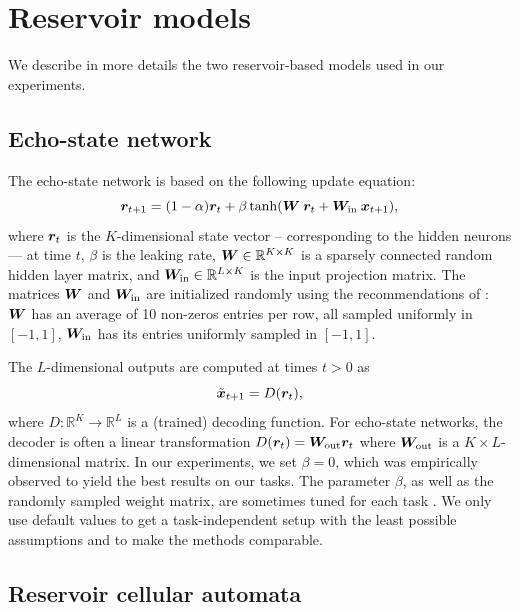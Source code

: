 \section{Reservoir models\label{sec:res-models}}
We describe in more details the two reservoir-based models used in our experiments.
\subsection{Echo-state network}
The echo-state network is based on the
following update equation:
\begin{equation}
  \label{eq:esn}
  {\bm{r}}_{t + 1} = (1 - \alpha) {\bm{r}}_{t} +
  \beta \tanh({\bm{W}}\: {\bm{r}}_{t} + {\bm{W}}_{\text{in}}\: {\bm{x}}_{t + 1}),
\end{equation}
where ${\bm{r}}_{t}$ is the $K$-dimensional state vector -- corresponding to the hidden neurons
--- at time $t$, $\beta$ is the leaking rate, ${\bm{W}} \in \mathbb{R}^{K \times K}$ is a sparsely
connected random hidden layer matrix, and ${\bm{W}}_{\text{in}} \in \mathbb{R}^{L \times K}$ is the
input projection matrix. The matrices ${\bm{W}}$ and ${\bm{W}}_{\text{in}}$ are
initialized randomly using the recommendations of
\parencite{jaegerLongShortTermMemory2012}: ${\bm{W}}$ has an average of 10 non-zeros
entries per row, all sampled uniformly in $[-1, 1]$, ${\bm{W}}_{\text{in}}$ has its
entries uniformly sampled in $[-1, 1]$.

The $L$-dimensional outputs are computed at times $t > 0$ as
\begin{equation}
  \label{eq:esn-res}
\tilde{{\bm{x}}}_{t+ 1} = D({\bm{r}}_{t}),
\end{equation}
where $D: \mathbb{R}^{K} \rightarrow \mathbb{R}^{L}$ is a (trained) decoding function. For echo-state networks, the
decoder is often a linear transformation
$D({\bm{r}}_{t}) = {\bm{W}}_{\text{out}} {\bm{r}}_{t}$ where ${\bm{W}}_{\text{out}}$ is a
$K \times L$-dimensional matrix. In our experiments, we set $\beta = 0$, which was
empirically observed to yield the best results on our tasks. The parameter $\beta$,
as well as the randomly sampled weight matrix, are sometimes tuned for each task
\parencite{jaegerLongShortTermMemory2012}. We only use
default values to get a task-independent setup with
the least possible assumptions and to make the methods comparable.

\subsection{Reservoir cellular automata\label{sec:app-ca-res}}

